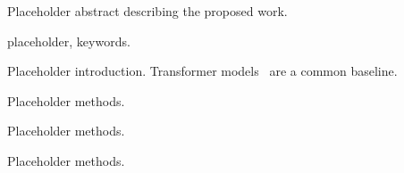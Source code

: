 \begin{center}
{\normalfont\bf \Title}
\end{center}


Placeholder abstract describing the proposed work.

placeholder, keywords.


Placeholder introduction. Transformer models~\cite{VaswaniETAL17Attention} are a common baseline.


Placeholder methods.

Placeholder methods.

Placeholder methods.

\statementend

